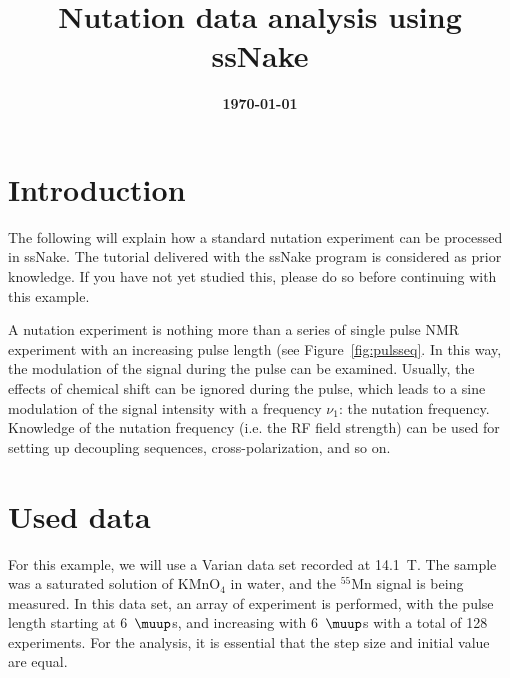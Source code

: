 \documentclass[11pt,a4paper]{article}
\title{\color{black}\fontfamily{SourceSansPro-LF}\bfseries Nutation data analysis using ssNake}
\date{\color{black}\fontfamily{SourceSansPro-LF}\bfseries \today}
\begin{document}


\maketitle

\section{Introduction}
The following will explain how a standard nutation experiment can be processed in ssNake. The tutorial delivered with the ssNake program is considered as prior knowledge. If you have not yet studied this, please do so before continuing with this example.

A nutation experiment is nothing more than a series of single pulse NMR experiment with an increasing pulse length (see Figure~\ref{fig:pulsseq}. In this way, the modulation of the signal during the pulse can be examined. Usually, the effects of chemical shift can be ignored during the pulse, which leads to a sine modulation of the signal intensity with a frequency $\nu_1$: the nutation frequency. Knowledge of the nutation frequency (i.e. the RF field strength) can be used for setting up decoupling sequences, cross-polarization, and so on.

\begin{center}
\label{fig:pulsseq}
\end{center}




\section{Used data}
For this example, we will use a Varian data set recorded at 14.1~T. The sample was a saturated solution of KMnO$_4$ in water, and the $^{55}$Mn signal is being measured. In this data set, an array of experiment is performed, with the pulse length starting at 6~$\muup$s, and increasing with 6~$\muup$s with a total of 128 experiments. For the analysis, it is essential that the step size and initial value are equal.
\end{document}
